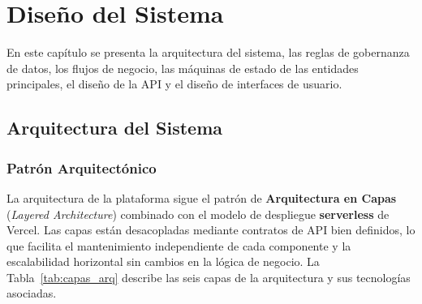 \section{Diseño del Sistema}

En este cap\'itulo se presenta la arquitectura del sistema, las reglas de
gobernanza de datos, los flujos de negocio, las m\'aquinas de estado de las entidades
principales, el dise\~no de la API y el dise\~no de interfaces de usuario.

\subsection{Arquitectura del Sistema}

\subsubsection{Patr\'on Arquitect\'onico}

La arquitectura de la plataforma sigue el patr\'on de \textbf{Arquitectura en Capas}
(\textit{Layered Architecture}) combinado con el modelo de despliegue \textbf{serverless}
de Vercel. Las capas est\'an desacopladas mediante contratos de API bien definidos, lo que
facilita el mantenimiento independiente de cada componente y la escalabilidad horizontal
sin cambios en la l\'ogica de negocio. La Tabla~\ref{tab:capas_arq} describe las seis
capas de la arquitectura y sus tecnolog\'ias asociadas.

